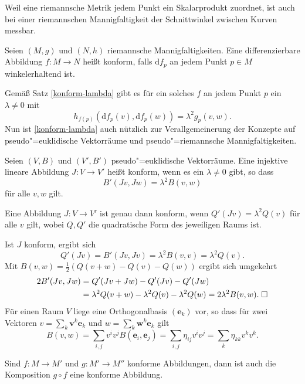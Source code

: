 Weil eine riemannsche Metrik jedem Punkt ein Skalarprodukt zuordnet,
ist auch bei einer riemannschen Mannigfaltigkeit der Schnittwinkel
zwischen Kurven messbar.
\begin{definition}
Seien $(M,g)$ und $(N,h)$ riemannsche Mannigfaltigkeiten. Eine
differenzierbare Abbildung $f\colon M\to N$ heißt konform,
falls $\mathrm df_p$ an jedem Punkt $p\in M$ winkelerhaltend ist.
\end{definition}
Gemäß Satz \ref{konform-lambda} gibt es für ein solches $f$ 
an jedem Punkt $p$ ein $\lambda\ne 0$ mit
\begin{equation}
h_{f(p)}(\mathrm df_p(v),\mathrm df_p(w)) = \lambda^2 g_p(v,w).
\end{equation}
Nun ist \ref{konform-lambda} auch nützlich zur Verallgemeinerung
der Konzepte auf pseudo"=euklidische Vektorräume
und pseudo"=riemannsche Mannigfaltigkeiten.
\begin{definition}
Seien $(V,B)$ und $(V',B')$ pseudo"=euklidische Vektorräume.
Eine injektive lineare Abbildung $J: V\to V'$ heißt konform, wenn
es ein $\lambda\ne 0$ gibt, so dass%
\begin{equation}
B'(Jv,Jw) = \lambda^2 B(v,w)
\end{equation}
für alle $v,w$ gilt.
\end{definition}
\begin{corollary}\label{konform-QF}
Eine Abbildung $J\colon V\to V'$ ist genau dann konform, wenn
$Q'(Jv)=\lambda^2 Q(v)$ für alle $v$ gilt, wobei $Q,Q'$
die quadratische Form des jeweiligen Raums ist.
\end{corollary}
 Ist $J$ konform, ergibt sich
\begin{equation}
Q'(Jv) = B'(Jv,Jv) = \lambda^2 B(v,v) = \lambda^2 Q(v).
\end{equation}
Mit $B(v,w) = \frac{1}{2}(Q(v+w)-Q(v)-Q(w))$ ergibt sich umgekehrt
\begin{align}
2B'(Jv,Jw) &= Q'(Jv+Jw)-Q'(Jv)-Q'(Jw)\\
&= \lambda^2 Q(v+w) - \lambda^2 Q(v) - \lambda^2 Q(w)
= 2\lambda^2 B(v,w).\;\Box
\end{align}
Für einen Raum $V$ liege eine Orthogonalbasis $(\mathbf e_k)$ vor, so dass
für zwei Vektoren $v=\sum_k\mathbf v^k\mathbf e_k$ und $w=\sum_k\mathbf w^k\mathbf e_k$
gilt
\begin{equation}
B(v,w) = \sum_{i,j} v^i v^j B(\mathbf e_i,\mathbf e_j)
= \sum_{i,j}\eta_{ij} v^i v^j = \sum_{k}\eta_{kk}v^k v^k.
\end{equation}
\begin{corollary}
Sind $f\colon M\to M'$ und $g\colon M'\to M''$ konforme Abbildungen,
dann ist auch die Komposition $g\circ f$ eine konforme Abbildung.
\end{corollary}
